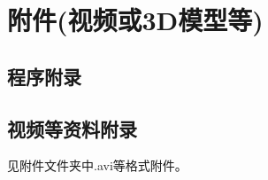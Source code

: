 \documentclass[UTF8,12pt]{ctexart}
\begin{document}
	\section{附件(视频或3D模型等)}
\subsection{程序附录}
	

	

	

	
	\subsection{视频等资料附录}
	见附件文件夹中.avi等格式附件。
\end{document}
